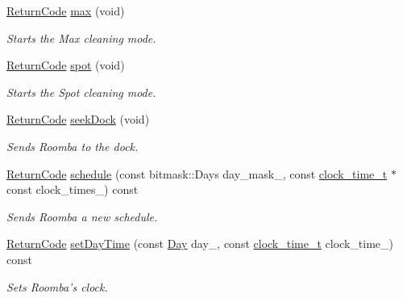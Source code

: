 \begin{DoxyCompactItemize}
\hyperlink{classroomba_1_1series500_1_1oi_1_1_o_i_command_ab408b9562318caf292794d8ba335d5ed}{Return\+Code} \hyperlink{classroomba_1_1series500_1_1oi_1_1_o_i_command_ae8eb0ac3e8e1901bb503433e496c1a6e}{max} (void)
\begin{DoxyCompactList}\small\item\em Starts the Max cleaning mode. \end{DoxyCompactList}\item 
\hyperlink{classroomba_1_1series500_1_1oi_1_1_o_i_command_ab408b9562318caf292794d8ba335d5ed}{Return\+Code} \hyperlink{classroomba_1_1series500_1_1oi_1_1_o_i_command_a24750b9202b29c51bda90119ca250a86}{spot} (void)
\begin{DoxyCompactList}\small\item\em Starts the Spot cleaning mode. \end{DoxyCompactList}\item 
\hyperlink{classroomba_1_1series500_1_1oi_1_1_o_i_command_ab408b9562318caf292794d8ba335d5ed}{Return\+Code} \hyperlink{classroomba_1_1series500_1_1oi_1_1_o_i_command_a901f9a41cf864cf79697003bedc91487}{seek\+Dock} (void)
\begin{DoxyCompactList}\small\item\em Sends Roomba to the dock. \end{DoxyCompactList}\item 
\hyperlink{classroomba_1_1series500_1_1oi_1_1_o_i_command_ab408b9562318caf292794d8ba335d5ed}{Return\+Code} \hyperlink{classroomba_1_1series500_1_1oi_1_1_o_i_command_a2e035bae3d5c8bb4ab9e3fa0c543f16e}{schedule} (const bitmask\+::\+Days day\+\_\+mask\+\_\+, const \hyperlink{structroomba_1_1series500_1_1oi_1_1_o_i_command_1_1clock__time__t}{clock\+\_\+time\+\_\+t} $\ast$const clock\+\_\+times\+\_\+) const 
\begin{DoxyCompactList}\small\item\em Sends Roomba a new schedule. \end{DoxyCompactList}\item 
\hyperlink{classroomba_1_1series500_1_1oi_1_1_o_i_command_ab408b9562318caf292794d8ba335d5ed}{Return\+Code} \hyperlink{classroomba_1_1series500_1_1oi_1_1_o_i_command_a4d0219ea30cc803dd07c267120a22fb1}{set\+Day\+Time} (const \hyperlink{namespaceroomba_1_1series500_1_1oi_a46858f88a73ed1b4e2ebc7ede94d1d84}{Day} day\+\_\+, const \hyperlink{structroomba_1_1series500_1_1oi_1_1_o_i_command_1_1clock__time__t}{clock\+\_\+time\+\_\+t} clock\+\_\+time\+\_\+) const 
\begin{DoxyCompactList}\small\item\em Sets Roomba’s clock. \end{DoxyCompactList}\item 

\end{DoxyCompactItemize}
